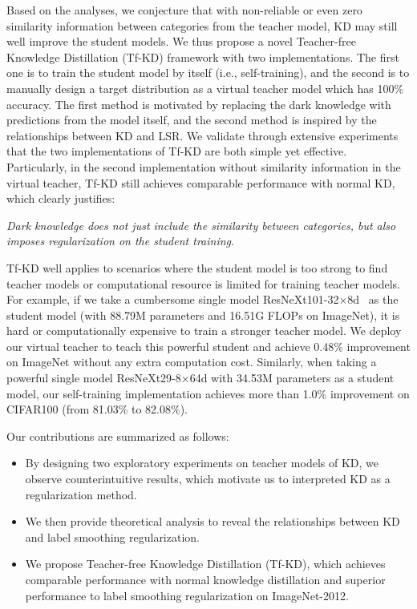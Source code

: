 \documentclass[10pt,twocolumn,letterpaper]{article}
\begin{document}
Based on the analyses, we conjecture that with non-reliable or even zero similarity information between categories from the teacher model, KD may still well improve the student models. 
We thus propose a novel Teacher-free Knowledge Distillation (Tf-KD) framework with two implementations. The first one is to train the student model by itself (i.e., self-training), and the second is to manually design a target distribution as a virtual teacher model which has 100\% accuracy. The first method is motivated by replacing the dark knowledge with predictions from the model itself, and  
the second method is inspired by the relationships between KD and LSR.  
We validate through extensive experiments that the two implementations of Tf-KD are both simple yet effective. Particularly, in the second implementation without similarity information in the virtual teacher, Tf-KD still achieves comparable performance with normal KD, which clearly justifies:  
\begin{center}
    \textit{Dark knowledge does not just include the similarity between categories, but also imposes  regularization on the student training}. 
\end{center}
Tf-KD well applies to scenarios where the student model is too strong to find teacher models or computational resource is limited for training teacher models. For example, if we take a cumbersome single model ResNeXt101-32$\times$8d~\cite{xie2017aggregated} as the student model (with 88.79M parameters and 16.51G FLOPs on ImageNet), it is hard or computationally expensive to train a stronger teacher model. We deploy our virtual teacher to teach this powerful student and achieve 0.48\% improvement on ImageNet without any extra computation cost. Similarly, when taking a powerful single model ResNeXt29-8$\times$64d with 34.53M parameters as a student model, our self-training implementation achieves more than 1.0\% improvement on CIFAR100 (from 81.03\% to 82.08\%).

Our contributions are summarized as follows:
\begin{itemize}
\item By designing two exploratory experiments on teacher models of KD, we observe counterintuitive results, which motivate us to interpreted KD as a regularization method.  
\vspace{-3pt}
\item We then provide theoretical analysis to reveal the relationships between KD and label smoothing regularization.
\vspace{-3pt}
\item We propose Teacher-free Knowledge Distillation (Tf-KD), which achieves comparable performance with normal knowledge distillation and superior performance to label smoothing regularization on ImageNet-2012. 
\end{itemize}
\end{document}
